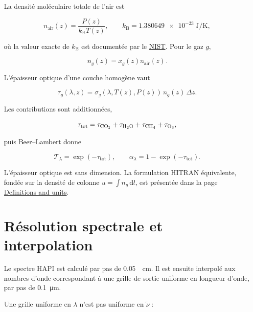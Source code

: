 \documentclass[11pt,a4paper]{article}
\begin{document}
La densité moléculaire totale de l'air est

\begin{equation}
  n_{\mathrm{air}}(z)=\frac{P(z)}{k_{\mathrm B}T(z)},
  \qquad
  k_{\mathrm B}=\SI{1.380649e-23}{\joule\per\kelvin},
\end{equation}

où la valeur exacte de $k_{\mathrm B}$ est documentée par le
\href{https://www.nist.gov/si-redefinition/kelvin/kelvin-boltzmann-constant}{NIST}.
Pour le gaz $g$,

\begin{equation}
  n_g(z)=x_g(z)n_{\mathrm{air}}(z).
\end{equation}

L'épaisseur optique d'une couche homogène vaut

\begin{equation}
  \tau_g(\lambda,z)=
  \sigma_g(\lambda,T(z),P(z))\,n_g(z)\,\Delta z.
\end{equation}

Les contributions sont additionnées,

\begin{equation}
  \tau_{\mathrm{tot}}=
  \tau_{\ce{CO2}}+\tau_{\ce{H2O}}+\tau_{\ce{CH4}}+\tau_{\ce{O3}},
\end{equation}

puis Beer--Lambert donne

\begin{equation}
  \mathcal T_\lambda=\exp(-\tau_{\mathrm{tot}}),
  \qquad
  \boxed{\alpha_\lambda=1-\exp(-\tau_{\mathrm{tot}})}.
\end{equation}

L'épaisseur optique est sans dimension. La formulation HITRAN équivalente,
fondée sur la densité de colonne $u=\int n_g\,\mathrm dl$, est présentée dans
la page
\href{https://hitran.org/docs/definitions-and-units/}{Definitions and units}.

\section{Résolution spectrale et interpolation}

Le spectre HAPI est calculé par pas de
\SI{0.05}{\per\centi\metre}. Il est ensuite interpolé aux nombres d'onde
correspondant à une grille de sortie uniforme en longueur d'onde, par pas de
\SI{0.1}{\micro\metre}.

Une grille uniforme en $\lambda$ n'est pas uniforme en $\widetilde\nu$ :
\end{document}
